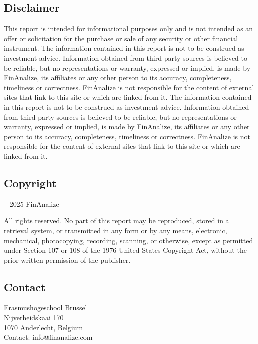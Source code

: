 

\thispagestyle{empty} %

\begin{twothirdswidth} %
    \footnotesize %

    \subsection*{Disclaimer}

    This report is intended for informational purposes only and is not intended as an offer or solicitation for the purchase or sale of any security or other financial instrument. The information contained in this report is not to be construed as investment advice. Information obtained from third-party sources is believed to be reliable, but no representations or warranty, expressed or implied, is made by FinAnalize, its affiliates or any other person to its accuracy, completeness, timeliness or correctness. FinAnalize is not responsible for the content of external sites that link to this site or which are linked from it. The information contained in this report is not to be construed as investment advice. Information obtained from third-party sources is believed to be reliable, but no representations or warranty, expressed or implied, is made by FinAnalize, its affiliates or any other person to its accuracy, completeness, timeliness or correctness. FinAnalize is not responsible for the content of external sites that link to this site or which are linked from it.
    \subsection*{Copyright}

    \textcopyright~ 2025 FinAnalize

    All rights reserved. No part of this report may be reproduced, stored in a retrieval system, or transmitted in any form or by any means, electronic, mechanical, photocopying, recording, scanning, or otherwise, except as permitted under Section 107 or 108 of the 1976 United States Copyright Act, without the prior written permission of the publisher.

    \subsection*{Contact}

    Erasmushogeschool Brussel\\
    Nijverheidskaai 170\\
    1070 Anderlecht, Belgium\\

    Contact: info@finanalize.com

\end{twothirdswidth}

